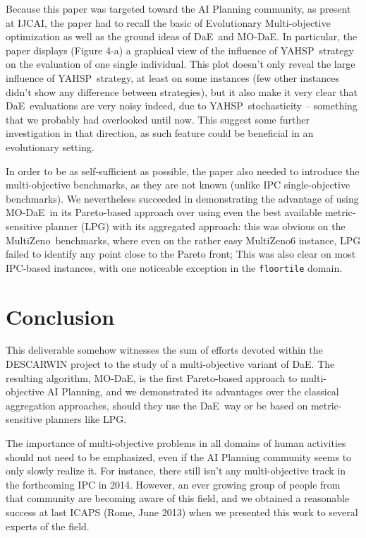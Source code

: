 \documentclass[english]{DESCARWINreport}
\def\DAE{{\sc DaE}}
\def\YAHSP{{\sc YAHSP}}
\def\MODAE{{\sc MO-DaE}}
\def\MULTIZENO{{\sc MultiZeno}}
\begin{document}
Because this paper was targeted toward the AI Planning community, as present at IJCAI, the paper had to recall the basic of Evolutionary Multi-objective optimization as well as the ground ideas of \DAE\ and \MODAE. In particular, the paper displays (Figure 4-a) a graphical view of the influence of \YAHSP\ strategy on the evaluation of one single individual. This plot doesn't only reveal the large influence of \YAHSP\ strategy, at least on some instances (few other instances didn't show any difference between strategies), but it also make it very clear that \DAE\ evaluations are very noisy indeed, due to \YAHSP\ stochasticity -- something that we probably had overlooked until now. This suggest some further investigation in that direction, as such feature could be beneficial in an evolutionary setting. 

In order to be as self-sufficient as possible, the paper also needed to introduce the multi-objective benchmarks, as they are not known (unlike IPC single-objective benchmarks). We nevertheless succeeded in demonstrating the advantage of using \MODAE\ in its Pareto-based approach over using even the best available metric-sensitive planner (LPG) with its aggregated approach: this was obvious on the \MULTIZENO\ benchmarks, where even on the rather easy \MULTIZENO6 instance, LPG failed to identify any point close to the Pareto front; This was also clear on most IPC-based instances, with one noticeable exception in the {\tt floortile} domain.

\newpage
\hoffset 0cm

\hoffset -2cm

\newpage
\hoffset -2cm

\chapter{Conclusion}

This deliverable somehow witnesses the sum of efforts devoted within the DESCARWIN project to the study of a multi-objective variant of \DAE. The resulting algorithm, \MODAE, is the first Pareto-based approach to multi-objective AI Planning, and we demonstrated its advantages over the classical aggregation approaches, should they use the \DAE\ way or be based on metric-sensitive planners like LPG.

The importance of multi-objective problems in all domains of human activities should not need to be emphasized, even if the AI Planning community seems to only slowly realize it. For instance, there still isn't any multi-objective track in the forthcoming IPC in 2014. However, an ever growing group of people from that community are becoming aware of this field, and we obtained a reasonable success at last ICAPS (Rome, June 2013) when we presented this work to several experts of the field. 
\end{document}
